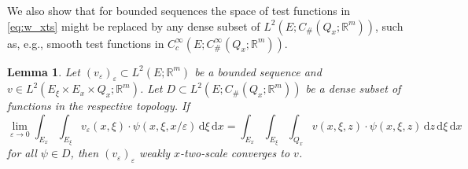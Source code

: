 \documentclass[reqno,11pt]{amsart}
\numberwithin{equation}{section}
\theoremstyle{thmlemcorr}
\numberwithin{theorem}{section}
\newtheorem{lemma}[theorem]{Lemma}
\theoremstyle{thmlemcorr*}
\theoremstyle{defi}
\theoremstyle{remexample}
\theoremstyle{ass}
\newcommand{\R}{\mathbb{R}}
\renewcommand{\epsilon}{\varepsilon}
\newcommand{\dd}{\,\mathrm{d}}
\newcommand{\1}{\mathds{1}}
\newcommand{\veps}{\varepsilon}
\newcommand{\sequence}[2]{(#1_#2)_{#2}}
\begin{document}
We also show that for bounded sequences the space of test functions in \eqref{eq:w_xts} might be replaced by any dense subset of \(L^2(E;C_{\#}(Q_x;\R^m))\), such as, e.g., smooth test functions in \(C_c^{\infty}(E;C_{\#}^{\infty}(Q_x;\R^m))\).
\begin{lemma}\label{lem:x_ts_approx}
    Let \(\sequence{v}{\veps}\subset L^2(E;\R^m)\) be a bounded sequence and \(v\in L^2(E_\xi\times E_x\times Q_x;\R^m)\). Let \(D\subset L^2(E;C_{\#}(Q_x;\R^m))\) be a dense subset of functions in the respective topology. If 
    \begin{equation}\label{eq:x_ts_approx}
    \lim_{\veps \to 0}\int_{E_x}\int_{E_\xi} v_\epsilon(x,\xi) \cdot \psi(x,\xi,x/\epsilon)\dd \xi\dd x 
    = \int_{E_x}\int_{E_\xi}\int_{Q_x}v(x,\xi,z) \cdot \psi(x,\xi,z)\dd z\dd \xi \dd x
    \end{equation}
    for all \(\psi\in D\), then \(\sequence{v}{\veps}\) weakly \(x\)-two-scale converges to \(v\).
\end{lemma}
\end{document}
